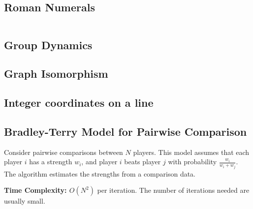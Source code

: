 \newpage

\subsection{Roman Numerals}

\hrulefill \vspace{-\baselineskip}
\begin{multicols}{2}
\inputminted[autogobble,fontsize=\tiny]{C++}{Misc/roman.cpp}
\end{multicols}
\vspace{-\baselineskip}
\noindent \hrulefill

\subsection{Group Dynamics}
\subsection{Graph Isomorphism}
\subsection{Integer coordinates on a line}
\subsection{Bradley-Terry Model for Pairwise Comparison}

Consider pairwise comparisons between $N$ players.
This model assumes that each player $i$ has a strength $w_i$,
and player $i$ beats player $j$ with probability $\frac{w_i}{w_i + w_j}$.
The algorithm estimates the strengths from a comparison data.

\textbf{Time Complexity: $O(N^2)$} per iteration. The number of iterations needed are usually small.

